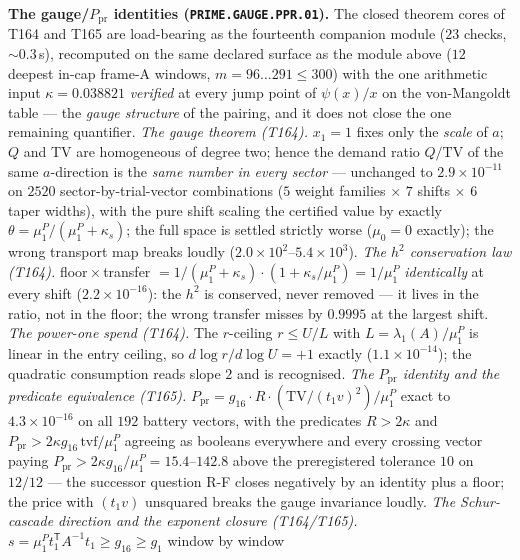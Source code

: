 \par\smallskip\noindent\textbf{The gauge/$P_{\mathrm{pr}}$ identities
(\texttt{PRIME.GAUGE.PPR.01}).}
The closed theorem cores of T164 and T165 are load-bearing as the
fourteenth companion module ($23$ checks, ${\sim}0.3$\,s), recomputed on
the same declared surface as the module above ($12$ deepest in-cap
frame-A windows, $m=96\ldots291\le300$) with the one arithmetic input
$\kappa=0.038821$ \emph{verified} at every jump point of $\psi(x)/x$ on
the von-Mangoldt table --- the \emph{gauge structure} of the pairing,
and it does not close the one remaining quantifier.
\emph{The gauge theorem (T164).} $x_1=1$ fixes only the \emph{scale} of
$a$; $Q$ and TV are homogeneous of degree two; hence the demand ratio
$Q/\mathrm{TV}$ of the same $a$-direction is the \emph{same number in
every sector} --- unchanged to $2.9\times10^{-11}$ on $2520$
sector-by-trial-vector combinations ($5$ weight families $\times$ $7$
shifts $\times$ $6$ taper widths), with the pure shift scaling the
certified value by exactly $\theta=\mu^P_1/(\mu^P_1+\kappa_s)$; the full
space is settled strictly worse ($\mu_0=0$ exactly); the wrong transport
map breaks loudly ($2.0\times10^{2}$--$5.4\times10^{3}$).
\emph{The $h^2$ conservation law (T164).}
floor${}\times{}$transfer $=1/(\mu^P_1+\kappa_s)\cdot(1+\kappa_s/\mu^P_1)
=1/\mu^P_1$ \emph{identically} at every shift ($2.2\times10^{-16}$): the
$h^2$ is conserved, never removed --- it lives in the ratio, not in the
floor; the wrong transfer misses by $0.9995$ at the largest shift.
\emph{The power-one spend (T164).} The $r$-ceiling $r\le U/L$ with
$L=\lambda_1(A)/\mu^P_1$ is linear in the entry ceiling, so
$d\log r/d\log U=+1$ exactly ($1.1\times10^{-14}$); the quadratic
consumption reads slope $2$ and is recognised.
\emph{The $P_{\mathrm{pr}}$ identity and the predicate equivalence
(T165).} $P_{\mathrm{pr}}=g_{16}\cdot R\cdot(\mathrm{TV}/(t_1v)^2)/\mu^P_1$
exact to $4.3\times10^{-16}$ on all $192$ battery vectors, with the
predicates $R>2\kappa$ and
$P_{\mathrm{pr}}>2\kappa g_{16}\,\mathrm{tvf}/\mu^P_1$ agreeing as
booleans everywhere and every crossing vector paying
$P_{\mathrm{pr}}>2\kappa g_{16}/\mu^P_1=15.4$--$142.8$ above the
preregistered tolerance $10$ on $12/12$ --- the successor question R-F
closes negatively by an identity plus a floor; the price with $(t_1v)$
unsquared breaks the gauge invariance loudly.
\emph{The Schur-cascade direction and the exponent closure (T164/T165).}
$s=\mu^P_1t_1^{\mathsf T}A^{-1}t_1\ge g_{16}\ge g_1$ window by window
